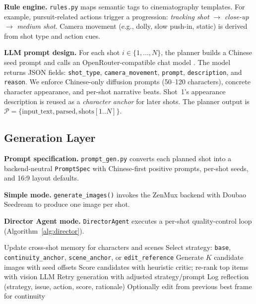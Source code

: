 \documentclass{article}
\begin{document}
\textbf{Rule engine.}
\texttt{rules.py} maps semantic tags to cinematography templates.
For example, pursuit-related actions trigger a progression: \textit{tracking shot} $\rightarrow$ \textit{close-up} $\rightarrow$ \textit{medium shot}.
Camera movement (e.g., dolly, slow push-in, static) is derived from shot type and action cues.

\textbf{LLM prompt design.}
For each shot $i \in \{1,\dots,N\}$, the planner builds a Chinese seed prompt and calls an OpenRouter-compatible chat model \citep{openrouter2024,deepseek2025}.
The model returns JSON fields: \texttt{shot\_type}, \texttt{camera\_movement}, \texttt{prompt}, \texttt{description}, and \texttt{reason}.
We enforce Chinese-only diffusion prompts (50--120 characters), concrete character appearance, and per-shot narrative beats.
Shot~1's appearance description is reused as a \textit{character anchor} for later shots.
The planner output is $\mathcal{P} = \{\text{input\_text}, \text{parsed}, \text{shots}[1..N]\}$.

\subsection{Generation Layer}

\textbf{Prompt specification.}
\texttt{prompt\_gen.py} converts each planned shot into a backend-neutral \texttt{PromptSpec} with Chinese-first positive prompts, per-shot seeds, and 16:9 layout defaults.

\textbf{Simple mode.}
\texttt{generate\_images()} invokes the ZenMux backend with Doubao Seedream \citep{seedream2025} to produce one image per shot.

\textbf{Director Agent mode.}
\texttt{DirectorAgent} executes a per-shot quality-control loop (Algorithm~\ref{alg:director}).

\begin{algorithm}[t]
\caption{Director Agent per-shot loop}
\label{alg:director}
\begin{algorithmic}[1]
  \STATE Update cross-shot memory for characters and scenes
  \STATE Select strategy: \texttt{base}, \texttt{continuity\_anchor}, \texttt{scene\_anchor}, or \texttt{edit\_reference}
  \STATE Generate $K$ candidate images with seed offsets
  \STATE Score candidates with heuristic critic; re-rank top items with vision LLM
    \STATE Retry generation with adjusted strategy/prompt
  \ENDIF
  \STATE Log reflection (strategy, issue, action, score, rationale)
  \STATE Optionally edit from previous best frame for continuity
\end{algorithmic}
\end{algorithm}
\end{document}
